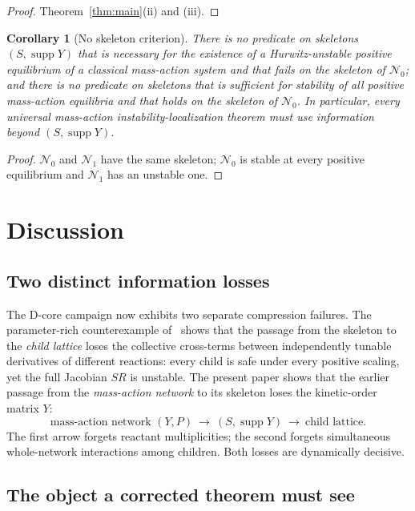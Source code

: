 \documentclass[11pt,a4paper]{article}
\theoremstyle{plain}
\newtheorem{corollary}[theorem]{Corollary}
\theoremstyle{definition}
\theoremstyle{remark}
\newcommand{\supp}{\operatorname{supp}}
\begin{document}
\begin{proof}
Theorem~\ref{thm:main}(ii) and (iii).
\end{proof}

\begin{corollary}[No skeleton criterion]\label{cor:no-skeleton}
There is no predicate on skeletons $(S,\supp Y)$ that is necessary for the existence of a Hurwitz-unstable positive equilibrium of a classical mass-action system and that fails on the skeleton of $\mathcal N_0$; and there is no predicate on skeletons that is sufficient for stability of all positive mass-action equilibria and that holds on the skeleton of $\mathcal N_0$. In particular, every universal mass-action instability-localization theorem must use information beyond $(S,\supp Y)$.
\end{corollary}

\begin{proof}
$\mathcal N_0$ and $\mathcal N_1$ have the same skeleton; $\mathcal N_0$ is stable at every positive equilibrium and $\mathcal N_1$ has an unstable one.
\end{proof}

\section{Discussion}\label{sec:discussion}

\subsection{Two distinct information losses}

The D-core campaign now exhibits two separate compression failures. The parameter-rich counterexample of~\cite{Companion2026} shows that the passage from the skeleton to the \emph{child lattice} loses the collective cross-terms between independently tunable derivatives of different reactions: every child is safe under every positive scaling, yet the full Jacobian $SR$ is unstable. The present paper shows that the earlier passage from the \emph{mass-action network} to its skeleton loses the kinetic-order matrix $Y$:
\[
  \text{mass-action network }(Y,P)\ \longrightarrow\ (S,\supp Y)\ \longrightarrow\ \text{child lattice}.
\]
The first arrow forgets reactant multiplicities; the second forgets simultaneous whole-network interactions among children. Both losses are dynamically decisive.

\subsection{The object a corrected theorem must see}
\end{document}
